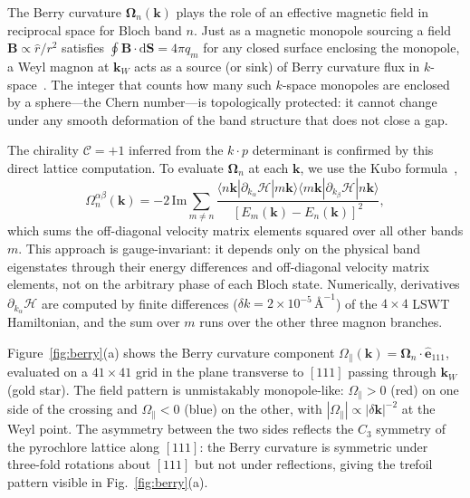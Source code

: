 \documentclass[aps,prb,twocolumn,superscriptaddress,longbibliography]{revtex4-2}
\begin{document}
The Berry curvature $\bm{\Omega}_n(\bm{k})$ plays the role of an effective
magnetic field in reciprocal space for Bloch band $n$.
Just as a magnetic monopole sourcing a field $\bm{B} \propto \hat{r}/r^2$
satisfies $\oint \bm{B}\cdot \mathrm{d}\bm{S} = 4\pi q_m$ for any
closed surface enclosing the monopole, a Weyl magnon at $\bm{k}_W$
acts as a source (or sink) of Berry curvature flux in $k$-space~\cite{Berry1984}.
The integer that counts how many such $k$-space monopoles are enclosed by
a sphere---the Chern number---is topologically protected: it cannot change
under any smooth deformation of the band structure that does not close a gap.

The chirality $\mathcal{C} = +1$ inferred from the $k \cdot p$ determinant
is confirmed by this direct lattice computation.
To evaluate $\bm{\Omega}_n$ at each $\bm{k}$, we use the Kubo
formula~\cite{Berry1984},
\begin{equation}
  \Omega^{\alpha\beta}_n(\bm{k}) = -2\,\mathrm{Im} \sum_{m \neq n}
  \frac{\langle n\bm{k} | \partial_{k_\alpha}\mathcal{H} | m\bm{k}\rangle
        \langle m\bm{k} | \partial_{k_\beta}\mathcal{H} | n\bm{k}\rangle}
       {[E_m(\bm{k}) - E_n(\bm{k})]^2},
  \label{eq:kubo_main}
\end{equation}
which sums the off-diagonal velocity matrix elements squared over all
other bands $m$.
This approach is gauge-invariant: it depends only on the physical band
eigenstates through their energy differences and off-diagonal velocity
matrix elements, not on the arbitrary phase of each Bloch state.
Numerically, derivatives $\partial_{k_\alpha}\mathcal{H}$ are computed
by finite differences ($\delta k = 2\times 10^{-5}\,\text{\AA}^{-1}$) of
the $4\times 4$ LSWT Hamiltonian, and the sum over $m$ runs over the other
three magnon branches.

Figure~\ref{fig:berry}(a) shows the Berry curvature component
$\Omega_\parallel(\bm{k}) = \bm{\Omega}_n \cdot \hat{\bm{e}}_{111}$,
evaluated on a $41\times 41$ grid in the plane transverse to $[111]$
passing through $\bm{k}_W$ (gold star).
The field pattern is unmistakably monopole-like: $\Omega_\parallel > 0$
(red) on one side of the crossing and $\Omega_\parallel < 0$ (blue) on
the other, with $|\Omega_\parallel| \propto |\delta\bm{k}|^{-2}$ at the
Weyl point.
The asymmetry between the two sides reflects the $C_3$ symmetry of
the pyrochlore lattice along $[111]$: the Berry curvature is symmetric
under three-fold rotations about $[111]$ but not under reflections, giving
the trefoil pattern visible in Fig.~\ref{fig:berry}(a).
\end{document}

